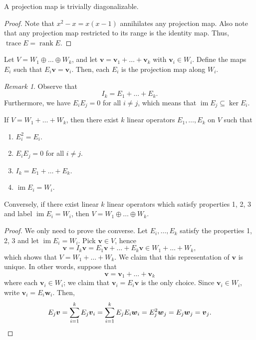 \documentclass[11pt]{article}
\renewcommand{\vec}[1]{\boldsymbol{#1}}
\newcommand{\vv}{\vec{v}}
\newcommand{\vw}{\vec{w}}
\renewcommand{\ker}{\operatorname{ker}}
\newcommand{\im}{\operatorname{im}}
\newcommand{\rank}{\operatorname{rank}}
\newcommand{\trace}{\operatorname{trace}}
\theoremstyle{definition}
\theoremstyle{remark}
\newtheorem*{remark}{Remark}
\numberwithin{equation}{section}
\begin{document}
    \begin{lemma}
        A projection map is trivially diagonalizable.
    \end{lemma}
    \begin{proof}
        Note that $x^2 - x = x(x -1)$ annihilates any projection map. Also note that
        any projection map restricted to its range is the identity map. Thus,
        $\trace{E} = \rank{E}$.
    \end{proof}

    \begin{lemma}
        Let $V = W_1 \oplus \dots \oplus W_k$, and let $\vv = \vv_1 + \dots + \vv_k$
        with $\vv_i \in W_i$. Define the maps $E_i$ such that $E_i\vv = \vv_i$. Then,
        each $E_i$ is the projection map along $W_i$.
        \begin{remark}
            Observe that \[
                I_k = E_1 + \dots + E_k.
            \] Furthermore, we have $E_iE_j = 0$ for all $i \neq j$, which means that
            $\im{E_j} \subseteq \ker{E_i}$.
        \end{remark}
    \end{lemma}

    \begin{theorem}
        If $V = W_1 + \dots + W_k$, then there exist $k$ linear operators $E_1,
        \dots, E_k$ on $V$ such that 
        \begin{enumerate}
            \itemsep0em
            \item $E_i^2 = E_i$.
            \item $E_iE_j = 0$ for all $i \neq j$.
            \item $I_k = E_1 + \dots + E_k$.
            \item $\im{E_i} = W_i$.
        \end{enumerate}
        Conversely, if there exist linear $k$ linear operators which satisfy
        properties 1, 2, 3 and label $\im{E_i} = W_i$, then $V = W_1 \oplus \dots
        \oplus W_k$.
    \end{theorem}
    \begin{proof}
        We only need to prove the converse. Let $E_i, \dots, E_k$ satisfy the
        properties 1, 2, 3 and let $\im{E_i} = W_i$. Pick $\vv\in V$, hence \[
            \vv = I_k\vv = E_1\vv + \dots + E_k\vv \in W_1 + \dots + W_k,
        \] which shows that $V = W_1 + \dots + W_k$. We claim that this
        representation of $\vv$ is unique. In other words, suppose that \[
            \vv = \vv_1 + \dots + \vv_k
        \] where each $\vv_i \in W_i$; we claim that $\vv_i = E_i\vv$ is the only
        choice. Since $\vv_i \in W_i$, write $\vv_i = E_i\vw_i$. Then, \[
            E_j\vv = \sum_{i = 1}^k E_j \vv_i = \sum_{i = 1}^k E_j E_i\vw_i =
            E_j^2\vw_j = E_j\vw_j = \vv_j. \qedhere
        \] 
    \end{proof}
\end{document}

